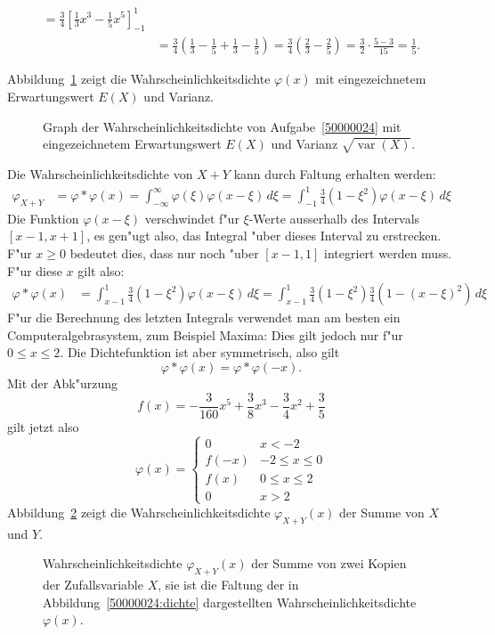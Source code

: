 \begin{loesung}
\begin{teilaufgaben}
\begin{align*}
=\frac34\left[\frac13x^3-\frac15x^5\right]_{-1}^1\\
&=\frac34\left(\frac13-\frac15+\frac13-\frac15\right)
=\frac34\left(\frac23-\frac25\right)
=\frac32\cdot\frac{5-3}{15}=\frac15.
\end{align*}
\item 
Abbildung~\ref{50000024:exvarx} zeigt die Wahrscheinlichkeitsdichte $\varphi(x)$
mit eingezeichnetem Erwartungswert $E(X)$ und Varianz.
\begin{figure}
\centering
{}
\caption{Graph der Wahrscheinlichkeitsdichte von Aufgabe~\ref{50000024} mit
eingezeichnetem Erwartungswert $E(X)$ und Varianz $\sqrt{\operatorname{var}(X)}$.
\label{50000024:exvarx}}
\end{figure}
\item
Die Wahrscheinlichkeitsdichte von $X+Y$ kann durch Faltung erhalten werden:
\begin{align*}
\varphi_{X+Y}&=\varphi*\varphi(x)
=\int_{-\infty}^{\infty}\varphi(\xi)\varphi(x-\xi)\,d\xi
=\int_{-1}^1\frac34(1-\xi^2)\varphi(x-\xi)\,d\xi
\end{align*}
Die Funktion $\varphi(x-\xi)$ verschwindet f"ur $\xi$-Werte ausserhalb
des Intervals $[x-1,x+1]$, es gen"ugt also, das Integral "uber dieses
Interval zu erstrecken. F"ur $x\ge 0$ bedeutet dies, dass nur noch
"uber $[x-1,1]$ integriert werden muss. F"ur diese $x$ gilt also:
\begin{align*}
\varphi*\varphi(x)
&=
\int_{x-1}^1 \frac34(1-\xi^2)\varphi(x-\xi)\,d\xi
=
\int_{x-1}^1 \frac34(1-\xi^2)\frac34(1-(x-\xi)^2)\,d\xi
\end{align*}
F"ur die Berechnung des letzten Integrals verwendet man am besten
ein Computeralgebrasystem, zum Beispiel Maxima:
Dies gilt jedoch nur f"ur $0\le x \le 2$. Die Dichtefunktion ist
aber symmetrisch, also gilt
\[
\varphi*\varphi(x)=\varphi*\varphi(-x).
\]
Mit der Abk"urzung
\[
f(x)=-\frac3{160}x^5+\frac38x^3-\frac34x^2+\frac35
\]
gilt jetzt also
\[
\varphi(x)=\begin{cases}
0&x<-2\\
f(-x)&-2\le x\le 0\\
f(x)&0\le x \le 2\\
0&x>2
\end{cases}
\]
Abbildung~\ref{50000024:summe} zeigt die Wahrscheinlichkeitsdichte $\varphi_{X+Y}(x)$
der Summe von $X$ und $Y$.
\qedhere
\begin{figure}
\centering
{}
\caption{Wahrscheinlichkeitsdichte $\varphi_{X+Y}(x)$ der Summe von zwei Kopien
der Zufallsvariable $X$, sie ist die Faltung der in Abbildung~\ref{50000024:dichte}
dargestellten Wahrscheinlichkeitsdichte $\varphi(x)$.
\label{50000024:summe}}
\end{figure}
\end{teilaufgaben}
\end{loesung}

